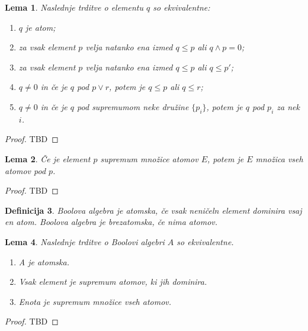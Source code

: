 \documentclass{amsart}
\newtheorem{izrek}{Izrek}[section]
\newtheorem{lema}[izrek]{Lema}
\newtheorem{definicija}[izrek]{Definicija}
\begin{document}
\begin{lema}
    Naslednje trditve o elementu $q$ so ekvivalentne:
    \begin{enumerate}
        \item $q$ je atom;
        \item za vsak element $p$ velja natanko ena izmed \(q \leq p\) ali \(q \wedge p = 0\);
        \item za vsak element $p$ velja natanko ena izmed \(q \leq p\) ali \(q \leq p'\);
        \item \(q \neq 0\) in če je $q$ pod \(p \vee r\), potem je \(q \leq p\) ali \(q \leq r\);
        \item \(q \neq 0\) in če je $q$ pod supremumom neke družine \(\{p_i\}\), potem je \(q\) pod \(p_i\) za nek \(i\).
    \end{enumerate}
\end{lema}

\begin{proof}
    TBD
\end{proof}

\begin{lema}
    Če je element \(p\) supremum množice atomov \(E\), potem je \(E\) množica vseh atomov pod \(p\).
\end{lema}

\begin{proof}
    TBD
\end{proof}


\begin{definicija}
    Boolova algebra je atomska, če vsak neničeln element dominira vsaj en atom. 
    Boolova algebra je brezatomska, če nima atomov.
\end{definicija}

\begin{lema}
    Naslednje trditve o Boolovi algebri \(A\) so ekvivalentne.
    \begin{enumerate}
        \item A je atomska.
        \item Vsak element je supremum atomov, ki jih dominira.
        \item Enota je supremum množice vseh atomov.
    \end{enumerate}
\end{lema}

\begin{proof}
    TBD
\end{proof}

\end{document}
